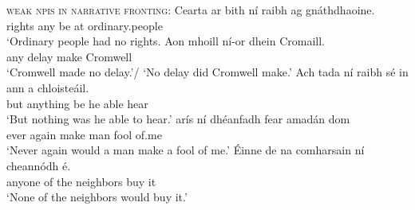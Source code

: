 \documentclass[output=paper,colorlinks,citecolor=brown]{langscibook}
\begin{document}
\ea\textsc{weak npis in narrative fronting}:\label{ex:npinarr1}
\ea
\gll Cearta {ar bith} ní raibh {\gapline} ag gnáthdhaoine. \\
    rights any {\no} {be\past} {} at ordinary.people\\
\glt `Ordinary people had no rights.
\ex
\gll Aon mhoill ní-or dhein Cromaill. {\gapline} \\
     any delay {\nior} {make\past} Cromwell {}\\
\glt `Cromwell made no delay.'/ `No delay did Cromwell make.'
\ex
\gll Ach tada ní raibh sé {in ann} {\gapline} a chloisteáil. \\
     but anything {\no} {be\past} he able {} {\vce} {hear\vn} \\    
\glt `But nothing was he able to hear.'
\ex
{} arís ní dhéanfadh fear amadán {\gapline} dom\\
     ever again {\no} {make\cond} man fool {} {of.me} \\
\glt `Never again would a man make a fool of me.'
\ex
\gll Éinne de na comharsain ní cheannódh é. \\
     anyone of the neighbors {\no} {buy\cond} it \\
\glt `None of the neighbors would buy it.'
\z
\z
{}
\end{document}
